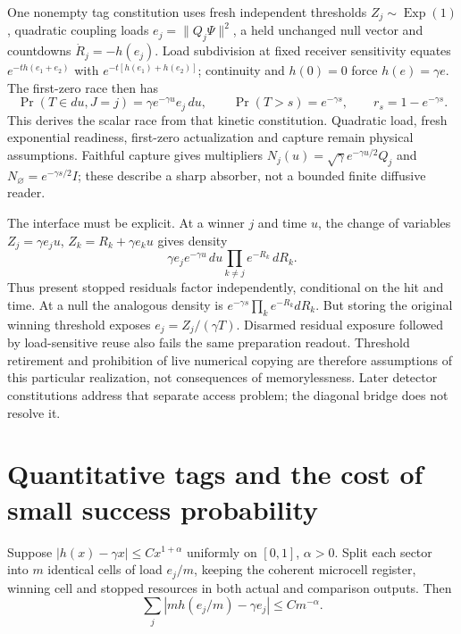 \documentclass[11pt,oneside,openany]{book}
\theoremstyle{definition}
\theoremstyle{remark}\newtheorem{remark}[theorem]{Remark}
\begin{document}
One nonempty tag constitution uses fresh independent thresholds $Z_j\sim\operatorname{Exp}(1)$, quadratic coupling loads $e_j=\|Q_j\Psi\|^2$, a held unchanged null vector and countdowns $\dot R_j=-h(e_j)$. Load subdivision at fixed receiver sensitivity equates
$e^{-t h(e_1+e_2)}$ with $e^{-t[h(e_1)+h(e_2)]}$; continuity and $h(0)=0$ force $h(e)=\gamma e$. The first-zero race then has
\begin{equation}
 \Pr(T\in du,J=j)=\gamma e^{-\gamma u}e_j\,du,\qquad
 \Pr(T>s)=e^{-\gamma s},\qquad r_s=1-e^{-\gamma s}.
 \label{cpc:eq:tagrace}
\end{equation}
This derives the scalar race from that kinetic constitution. Quadratic load, fresh exponential readiness, first-zero actualization and capture remain physical assumptions. Faithful capture gives multipliers
$N_j(u)=\sqrt\gamma e^{-\gamma u/2}Q_j$ and
$N_\varnothing=e^{-\gamma s/2}I$; these describe a sharp absorber, not a bounded finite diffusive reader.

The interface must be explicit. At a winner $j$ and time $u$, the change of variables $Z_j=\gamma e_ju$, $Z_k=R_k+\gamma e_ku$ gives density
\[
 \gamma e_je^{-\gamma u}\,du\prod_{k\ne j}e^{-R_k}\,dR_k.
\]
Thus present stopped residuals factor independently, conditional on the hit and time. At a null the analogous density is $e^{-\gamma s}\prod_ke^{-R_k}dR_k$. But storing the original winning threshold exposes $e_j=Z_j/(\gamma T)$. Disarmed residual exposure followed by load-sensitive reuse also fails the same preparation readout. Threshold retirement and prohibition of live numerical copying are therefore assumptions of this particular realization, not consequences of memorylessness. Later detector constitutions address that separate access problem; the diagonal bridge does not resolve it.

\section{Quantitative tags and the cost of small success probability}

Suppose $|h(x)-\gamma x|\le Cx^{1+\alpha}$ uniformly on $[0,1]$, $\alpha>0$. Split each sector into $m$ identical cells of load $e_j/m$, keeping the coherent microcell register, winning cell and stopped resources in both actual and comparison outputs. Then
\begin{equation}
 \sum_j|m h(e_j/m)-\gamma e_j|\le C m^{-\alpha}.
 \label{cpc:eq:refinerates}
\end{equation}
\end{document}
